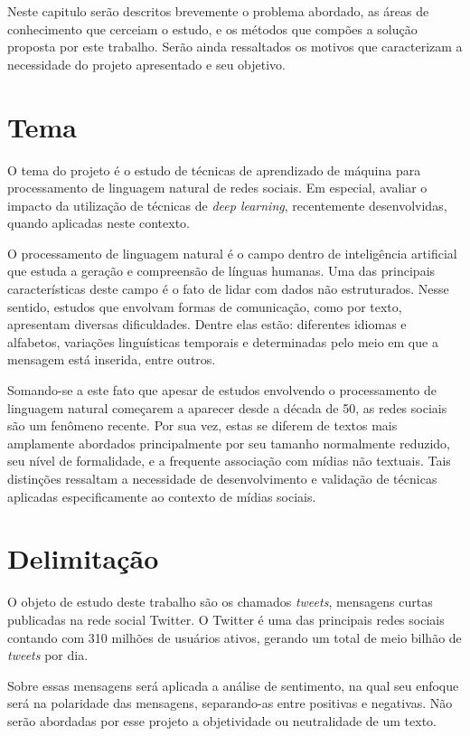 Neste capitulo serão descritos brevemente o problema abordado, as áreas de conhecimento que cerceiam o estudo, e os
métodos que compões a solução proposta por este trabalho.
Serão ainda ressaltados os motivos que caracterizam a necessidade do projeto apresentado e seu objetivo.

\section{Tema}

O tema do projeto é o estudo de técnicas de aprendizado de máquina para processamento de linguagem natural de redes
sociais.
Em especial, avaliar o impacto da utilização de técnicas de \textit{deep learning}, recentemente desenvolvidas, quando
aplicadas neste contexto.

O processamento de linguagem natural é o campo dentro de inteligência artificial que estuda a geração e compreensão de
línguas humanas.
Uma das principais características deste campo é o fato de lidar com dados não estruturados.
Nesse sentido, estudos que envolvam formas de comunicação, como por texto, apresentam diversas dificuldades.
Dentre elas estão: diferentes idiomas e alfabetos, variações linguísticas temporais e determinadas pelo meio em que a
mensagem está inserida, entre outros.

Somando-se a este fato que apesar de estudos envolvendo o processamento de linguagem natural começarem a aparecer desde
a década de 50, as redes sociais são um fenômeno recente.
Por sua vez, estas se diferem de textos mais amplamente abordados principalmente por seu tamanho normalmente reduzido,
seu nível de formalidade, e a frequente associação com mídias não textuais.
Tais distinções ressaltam a necessidade de desenvolvimento e validação de técnicas aplicadas especificamente ao contexto
de mídias sociais.

\section{Delimitação}

O objeto de estudo deste trabalho são os chamados \textit{tweets}, mensagens curtas publicadas na rede social Twitter.
O Twitter é uma das principais redes sociais contando com 310 milhões de usuários ativos, gerando um total de meio
bilhão de \textit{tweets} por dia.

Sobre essas mensagens será aplicada a análise de sentimento, na qual seu enfoque será na polaridade das mensagens,
separando-as entre positivas e negativas.
Não serão abordadas por esse projeto a objetividade ou neutralidade de um texto.

